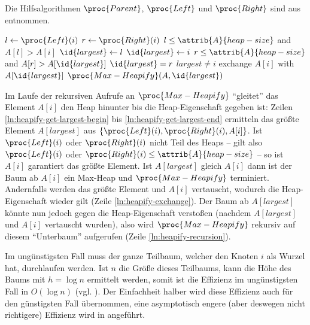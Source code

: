 Die Hilfsalgorithmen $\proc{Parent}$, $\proc{Left}$ und $\proc{Right}$ sind aus \cite[152]{clrs2001} entnommen.

\begin{codebox}
    \li $l \gets \proc{Left}(i)$\label{ln:heapify-get-largest-begin}
    \li $r \gets \proc{Right}(i)$
    \li \If $l \leq \attrib{A}{heap-size}$ and $A[l] > A[i]$
    \li      \Then
                $\id{largest} \gets l$
    \li     \Else
                $\id{largest} \gets i$
            \End
    \li \If $r \leq \attrib{A}{heap-size}$ and $A[r] > A[\id{largest}]$
    \li     \Then
                $\id{largest} = r$
            \End\label{ln:heapify-get-largest-end}
    \li \If $largest \neq i$ \label{ln:heapify-largest}
    \li     \Then
                exchange $A[i]$ with $A[\id{largest}]$\label{ln:heapify-exchange}
    \li         $\proc{Max-Heapify}(A, \id{largest})$\label{ln:heapify-recursion}
            \End
\end{codebox}

Im Laufe der rekursiven Aufrufe an $\proc{Max-Heapify}$ \enquote{gleitet} das Element $A[i]$ den Heap hinunter bis die Heap-Eigenschaft gegeben ist: Zeilen \ref{ln:heapify-get-largest-begin} bis \ref{ln:heapify-get-largest-end} ermitteln das größte Element $A[largest]$ aus $\{\proc{Left}(i), \proc{Right}(i), A[i]\}$. Ist $\proc{Left}(i)$ oder $\proc{Right}(i)$ nicht Teil des Heaps -- gilt also $\proc{Left}(i)$ oder $\proc{Right}(i) \leq \attrib{A}{heap-size}$ -- so ist $A[i]$ garantiert das größte Element. Ist $A[largest]$ gleich $A[i]$ dann ist der Baum ab $A[i]$ ein Max-Heap und $\proc{Max-Heapify}$ terminiert. Andernfalls werden das größte Element und $A[i]$ vertauscht, wodurch die Heap-Eigenschaft wieder gilt (Zeile \ref{ln:heapify-exchange}). Der Baum ab $A[largest]$ könnte nun jedoch gegen die Heap-Eigenschaft verstoßen (nachdem $A[largest]$ und $A[i]$ vertauscht wurden), also wird $\proc{Max-Heapify}$ rekursiv auf diesem \enquote{Unterbaum} aufgerufen (Zeile \ref{ln:heapify-recursion}).

Im ungünstigsten Fall muss der ganze Teilbaum, welcher den Knoten $i$ als Wurzel hat, durchlaufen werden. Ist $n$ die Größe dieses Teilbaums, kann die Höhe des Baums mit $h = \log n$ ermittelt werden, somit ist die Effizienz im ungünstigsten Fall in $O(\log n)$ (vgl. \cite[155]{clrs2001}). Der Einfachheit halber wird diese Effizienz auch für den günstigsten Fall übernommen, eine asymptotisch engere (aber deswegen nicht richtigere) Effizienz wird in \cite{bff1996} angeführt.

